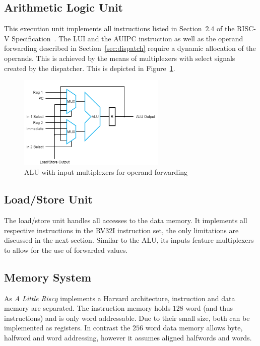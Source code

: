 \documentclass[conference]{IEEEtran}
\begin{document}
\subsection{Arithmetic Logic Unit}
This execution unit implements all instructions listed in Section~$2.4$ of the RISC-V Specification~\cite{risc-v}. The LUI and the AUIPC instruction as well as the operand forwarding described in Section~\ref{sec:dispatch} require a dynamic allocation of the operands. This is achieved by the means of multiplexers with select signals created by the dispatcher. This is depicted in Figure~\ref{fig:alu}.

\begin{figure}
	\centering
	\includegraphics[width=7cm]{alu_mux.png}
	\caption{ALU with input multiplexers for operand forwarding}
	\label{fig:alu}
\end{figure}

\subsection{Load/Store Unit} \label{sec:load_store}
The load/store unit handles all accesses to the data memory. It implements all respective instructions in the RV32I instruction set, the only limitations are discussed in the next section. Similar to the ALU, its inputs feature multiplexers to allow for the use of forwarded values.

\subsection{Memory System} \label{sec:memory}
As \emph{A Little Riscy} implements a Harvard architecture, instruction and data memory are separated. The instruction memory holds $128$ word (and thus instructions) and is only word addressable. Due to their small size, both can be implemented as registers. In contrast the $256$ word data memory allows byte, halfword and word addressing, however it assumes aligned halfwords and words.
\end{document}
